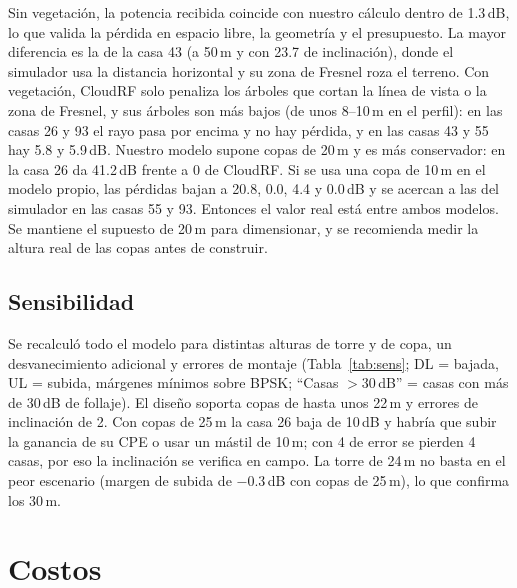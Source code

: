 \documentclass[11pt,a4paper]{article}
\begin{document}
Sin vegetación, la potencia recibida coincide con nuestro cálculo dentro de 1.3\,dB, lo que valida la pérdida en espacio libre, la geometría y el presupuesto. La mayor diferencia es la de la casa 43 (a 50\,m y con 23.7\textdegree{} de inclinación), donde el simulador usa la distancia horizontal y su zona de Fresnel roza el terreno. Con vegetación, CloudRF solo penaliza los árboles que cortan la línea de vista o la zona de Fresnel, y sus árboles son más bajos (de unos 8--10\,m en el perfil): en las casas 26 y 93 el rayo pasa por encima y no hay pérdida, y en las casas 43 y 55 hay 5.8 y 5.9\,dB. Nuestro modelo supone copas de 20\,m y es más conservador: en la casa 26 da 41.2\,dB frente a 0 de CloudRF. Si se usa una copa de 10\,m en el modelo propio, las pérdidas bajan a 20.8, 0.0, 4.4 y 0.0\,dB y se acercan a las del simulador en las casas 55 y 93. Entonces el valor real está entre ambos modelos. Se mantiene el supuesto de 20\,m para dimensionar, y se recomienda medir la altura real de las copas antes de construir.

\subsection{Sensibilidad}
Se recalculó todo el modelo para distintas alturas de torre y de copa, un desvanecimiento adicional y errores de montaje (Tabla~\ref{tab:sens}; DL = bajada, UL = subida, márgenes mínimos sobre BPSK; ``Casas $>$30\,dB'' = casas con más de 30\,dB de follaje). El diseño soporta copas de hasta unos 22\,m y errores de inclinación de 2\textdegree. Con copas de 25\,m la casa 26 baja de 10\,dB y habría que subir la ganancia de su CPE o usar un mástil de 10\,m; con 4\textdegree{} de error se pierden 4 casas, por eso la inclinación se verifica en campo. La torre de 24\,m no basta en el peor escenario (margen de subida de $-0.3$\,dB con copas de 25\,m), lo que confirma los 30\,m.
\begin{table}[H]\centering\caption{Escenarios de sensibilidad.}\label{tab:sens}\footnotesize\end{table}

\section{Costos}
\end{document}
